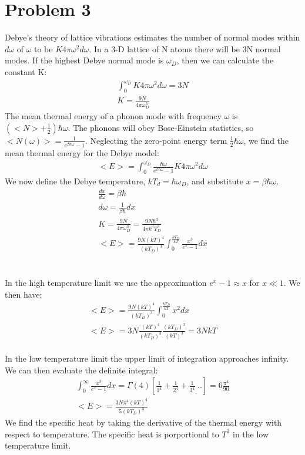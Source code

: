 \documentclass[a4paper,10pt]{article}
\numberwithin{equation}{section}
\begin{document}
\section{Problem 3}
Debye's theory of lattice vibrations estimates the number of normal modes within $d\omega$ of $\omega$ to be $K4\pi\omega ^2 d\omega$.
In a 3-D lattice of N atoms there will be 3N normal modes. If the highest Debye normal mode is $\omega_D$, then we can calculate the constant K:
\begin{gather}
 \int_{0}^{\omega_D}K4\pi\omega ^2 d\omega=3N\\
 K=\frac{9N}{4\pi \omega_{D}^{3}}
\end{gather}
The mean thermal energy of a phonon mode with frequency $\omega$ is $(<N>+\frac{1}{2})\hbar \omega$.
The phonons will obey Bose-Einstein statistics, so $<N(\omega)>=\frac{1}{e^{\beta \hbar \omega}-1}$.
Neglecting the zero-point energy term $\frac{1}{2}\hbar \omega$, we find the mean thermal energy for the Debye model:
\begin{gather}
 <E>=\int_{0}^{\omega_D}\frac{\hbar \omega}{e^{\beta \hbar \omega}-1}K4\pi \omega^2d\omega
\end{gather}
We now define the Debye temperature, $kT_d=\hbar \omega_D$, and substitute $x=\beta \hbar \omega$.
\begin{gather}
 \frac{dx}{d\omega}=\beta \hbar\\
 d\omega=\frac{1}{\beta \hbar}dx\\
 K=\frac{9N}{4\pi \omega_{D}^{3}}=\frac{9N\hbar^3}{4\pi k^3 T_D^3}\\
 <E>=\frac{9N(kT)^4}{(kT_D)^3}\int_{0}^{\frac{kT_D}{kT}}\frac{x^3}{e^x-1}dx
\end{gather}
\\ \\
In the high temperature limit we use the approximation $e^x-1\approx x$ for $x\ll1$. We then have:
\begin{gather}
  <E>=\frac{9N(kT)^4}{(kT_D)^3}\int_{0}^{\frac{kT_D}{kT}}x^2dx\\
  <E>=3N\frac{(kT)^4}{(kT_D)^3}\frac{(kT_D)^3}{(kT)^3}=3NkT
\end{gather}
\\
In the low temperature limit the upper limit of integration approaches infinity. 
We can then evaluate the definite integral:
\begin{gather}
 \int_{0}^{\infty}\frac{x^3}{e^x-1}dx=\Gamma(4)[\frac{1}{1^4}+\frac{1}{2^4}+\frac{1}{3^4}_...]
 =6\frac{\pi^4}{90}\\
 <E>=\frac{3N\pi^4(kT)^4}{5(kT_D)^3}
\end{gather}
We find the specific heat by taking the derivative of the thermal energy with respect to temperature. 
The specific heat is porportional to $T^3$ in the low temperature limit.
\end{document}
